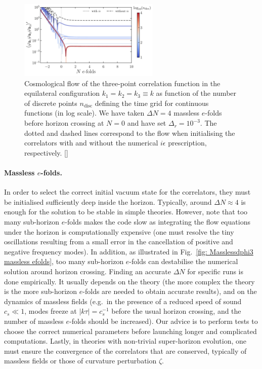 \documentclass[11pt]{article}
\numberwithin{equation}{section} %
\begin{document}
\begin{figure}[h!]
  \centering
  \includegraphics[width=0.6\textwidth]{Figures/Masslessdphi3_TimeDiscretisation.pdf}
  \vspace*{0.2cm}
  \caption{Cosmological flow of the three-point correlation function in the equilateral configuration $k_1=k_2=k_3 \equiv k$ as function of the number of discrete points $n_{\text{disc}}$ defining the time grid for continuous functions (in log scale). We have taken $\Delta N=4$ massless $e$-folds before horizon crossing at $N=0$ and have set $\Delta_r = 10^{-3}$. The dotted and dashed lines correspond to the flow when initialising the correlators with and without the numerical $i\epsilon$ prescription, respectively. [\href{https://github.com/deniswerth/CosmoFlow/blob/main/CosmoFlow/Massless_dphi3/PossibleIssues.ipynb}{\faGithub}]}
  \label{fig: Masslessdphi3 time discretisation}
\end{figure}


\paragraph{Massless $e$-folds.} In order to select the correct initial vacuum state for the correlators, they must be initialised sufficiently deep inside the horizon. Typically, around $\Delta N \approx 4$ is enough for the solution to be stable in simple theories. However, note that too many sub-horizon $e$-folds makes the code slow as integrating the flow equations under the horizon is computationally expensive (one must resolve the tiny oscillations resulting from a small error in the cancellation of positive and negative frequency modes). In addition, as illustrated in Fig.~\ref{fig: Masslessdphi3 massless efolds}, too many sub-horizon $e$-folds can destabilise the numerical solution around horizon crossing. Finding an accurate $\Delta N$ for specific runs is done empirically. It usually depends on the theory (the more complex the theory is the more sub-horizon $e$-folds are needed to obtain accurate results), and on the dynamics of massless fields (e.g.~in the presence of a reduced speed of sound $c_s\ll 1$, modes freeze at $|k\tau|=c_s^{-1}$ before the usual horizon crossing, and the number of massless $e$-folds should be increased). Our advice is to perform tests to choose the correct numerical parameters before launching longer and complicated computations. Lastly, in theories with non-trivial super-horizon evolution, one must ensure the convergence of the correlators that are conserved, typically of massless fields or those of curvature perturbation $\zeta$. 
\end{document}

